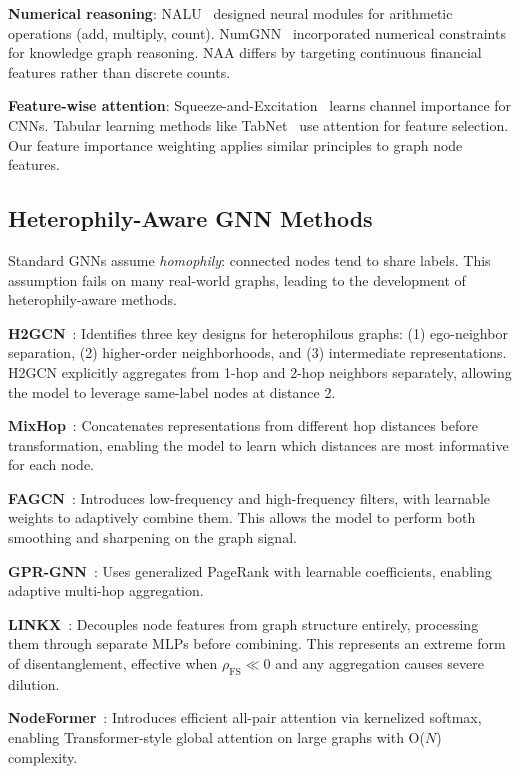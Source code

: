 \textbf{Numerical reasoning}: NALU~\cite{trask2018nalu} designed neural modules for arithmetic operations (add, multiply, count). NumGNN~\cite{wang2021numgnn} incorporated numerical constraints for knowledge graph reasoning. NAA differs by targeting continuous financial features rather than discrete counts.

\textbf{Feature-wise attention}: Squeeze-and-Excitation~\cite{hu2018senet} learns channel importance for CNNs. Tabular learning methods like TabNet~\cite{arik2021tabnet} use attention for feature selection. Our feature importance weighting applies similar principles to graph node features.

\subsection{Heterophily-Aware GNN Methods}

Standard GNNs assume \textit{homophily}: connected nodes tend to share labels. This assumption fails on many real-world graphs, leading to the development of heterophily-aware methods.

\textbf{H2GCN}~\cite{zhu2020beyond}: Identifies three key designs for heterophilous graphs: (1) ego-neighbor separation, (2) higher-order neighborhoods, and (3) intermediate representations. H2GCN explicitly aggregates from 1-hop and 2-hop neighbors separately, allowing the model to leverage same-label nodes at distance 2.

\textbf{MixHop}~\cite{abu2019mixhop}: Concatenates representations from different hop distances before transformation, enabling the model to learn which distances are most informative for each node.

\textbf{FAGCN}~\cite{bo2021fagcn}: Introduces low-frequency and high-frequency filters, with learnable weights to adaptively combine them. This allows the model to perform both smoothing and sharpening on the graph signal.

\textbf{GPR-GNN}~\cite{chien2021gprgnn}: Uses generalized PageRank with learnable coefficients, enabling adaptive multi-hop aggregation.

\textbf{LINKX}~\cite{luan2022linkx}: Decouples node features from graph structure entirely, processing them through separate MLPs before combining. This represents an extreme form of disentanglement, effective when $\rho_{\text{FS}} \ll 0$ and any aggregation causes severe dilution.

\textbf{NodeFormer}~\cite{wu2023nodeformer}: Introduces efficient all-pair attention via kernelized softmax, enabling Transformer-style global attention on large graphs with O($N$) complexity.

